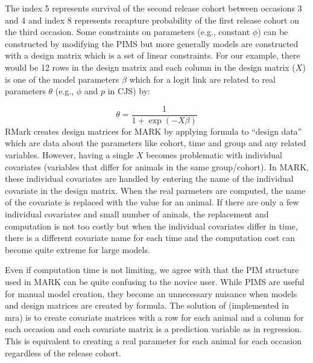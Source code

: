 \documentclass[12pt]{article}
\begin{document}
\noindent The index 5 represents survival of the second release cohort
between occasions 3 and 4 and index 8 represents recapture probability
of the first release cohort on the third occasion. Some constraints
on parameters (e.g., constant $\phi$) can be constructed by modifying
the PIMS but more generally models are constructed with a design matrix
which is a set of linear constraints. For our example, there would
be 12 rows in the design matrix and each column in the design matrix
($X$) is one of the model parameters $\beta$ which for a logit link
are related to real parameters $\theta$ (e.g., $\phi$ and $p$ in
CJS) by:

\noindent 
\begin{equation}
\theta=\frac{1}{1+\exp(-X\beta)}\label{eq:link}
\end{equation}
RMark creates design matrices for MARK by applying formula to ``design
data'' which are data about the parameters like cohort, time and
group and any related variables. However, having a single $X$ becomes
problematic with individual covariates (variables that differ for
animals in the same group/cohort). In MARK, these individual covariates
are handled by entering the name of the individual covariate in the
design matrix. When the real parmeters are computed, the name of the
covariate is replaced with the value for an animal. If there are only
a few individual covariates and small number of aninals, the replacement
and computation is not too costly but when the individual covariates
differ in time, there is a different covariate name for each time
and the computation cost can become quite extreme for large models. 

Even if computation time is not limiting, we agree with \citet{McDonald2005}
that the PIM structure used in MARK can be quite confusing to the
novice user. While PIMS are useful for manual model creation, they
become an unnecessary nuisance when models and design matrices are
created by formula. The solution of \citet{McDonald2005} (implemented
in mra) is to create covariate matrices with a row for each animal
and a column for each occasion and each covariate matrix is a prediction
variable as in regression. This is equivalent to creating a real parameter
for each animal for each occasion regardless of the release cohort.
\end{document}
